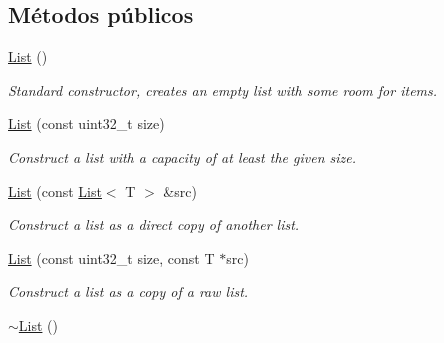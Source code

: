 \subsection*{\-Métodos públicos}
\begin{DoxyCompactItemize}
\item 
\hypertarget{classxsens_1_1List_a321ae5eb368522d23976d8c8d1dadb47}{\hyperlink{classxsens_1_1List_a321ae5eb368522d23976d8c8d1dadb47}{\-List} ()}\label{classxsens_1_1List_a321ae5eb368522d23976d8c8d1dadb47}

\begin{DoxyCompactList}\small\item\em \-Standard constructor, creates an empty list with some room for items. \end{DoxyCompactList}\item 
\hypertarget{classxsens_1_1List_a8a922de4c6e9021f98dfee1d1fca5eb0}{\hyperlink{classxsens_1_1List_a8a922de4c6e9021f98dfee1d1fca5eb0}{\-List} (const uint32\-\_\-t size)}\label{classxsens_1_1List_a8a922de4c6e9021f98dfee1d1fca5eb0}

\begin{DoxyCompactList}\small\item\em \-Construct a list with a capacity of at least the given size. \end{DoxyCompactList}\item 
\hypertarget{classxsens_1_1List_a4a2967760fc4e1b0f5f3a058d3a874fe}{\hyperlink{classxsens_1_1List_a4a2967760fc4e1b0f5f3a058d3a874fe}{\-List} (const \hyperlink{classxsens_1_1List}{\-List}$<$ \-T $>$ \&src)}\label{classxsens_1_1List_a4a2967760fc4e1b0f5f3a058d3a874fe}

\begin{DoxyCompactList}\small\item\em \-Construct a list as a direct copy of another list. \end{DoxyCompactList}\item 
\hypertarget{classxsens_1_1List_aaeade7f696d9cb1ec085eea43575990f}{\hyperlink{classxsens_1_1List_aaeade7f696d9cb1ec085eea43575990f}{\-List} (const uint32\-\_\-t size, const \-T $\ast$src)}\label{classxsens_1_1List_aaeade7f696d9cb1ec085eea43575990f}

\begin{DoxyCompactList}\small\item\em \-Construct a list as a copy of a raw list. \end{DoxyCompactList}\item 
\hypertarget{classxsens_1_1List_a4d4a5cbd11cda6022990701c97276980}{\hyperlink{classxsens_1_1List_a4d4a5cbd11cda6022990701c97276980}{$\sim$\-List} ()}\label{classxsens_1_1List_a4d4a5cbd11cda6022990701c97276980}


\end{DoxyCompactItemize}
